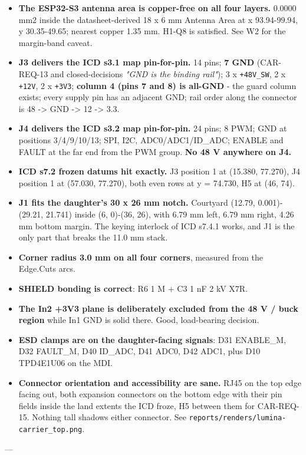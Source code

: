 \documentclass[11pt,a4paper]{article}
\begin{document}
\begin{itemize}
\item \textbf{The ESP32-S3 antenna area is copper-free on all four layers.} 0.0000 mm2 inside
the datasheet-derived 18 x 6 mm Antenna Area at x 93.94-99.94, y 30.35-49.65;
nearest copper 1.35 mm. H1-Q8 is satisfied. See W2 for the margin-band caveat.
\item \textbf{J3 delivers the ICD s3.1 map pin-for-pin.} 14 pins; \textbf{7 GND} (CAR-REQ-13 and
closed-decisions \emph{"GND is the binding rail"}); 3 x \texttt{+48V\_SW}, 2 x \texttt{+12V}, 2 x
\texttt{+3V3}; \textbf{column 4 (pins 7 and 8) is all-GND} - the guard column exists; every
supply pin has an adjacent GND; rail order along the connector is 48 -\textgreater{} GND -\textgreater{} 12
-\textgreater{} 3.3.
\item \textbf{J4 delivers the ICD s3.2 map pin-for-pin.} 24 pins; 8 PWM; GND at positions
3/4/9/10/13; SPI, I2C, ADC0/ADC1/ID\_ADC; ENABLE and FAULT at the far end from the
PWM group. \textbf{No 48 V anywhere on J4.}
\item \textbf{ICD s7.2 frozen datums hit exactly.} J3 position 1 at (15.380, 77.270), J4
position 1 at (57.030, 77.270), both even rows at y = 74.730, H5 at (46, 74).
\item \textbf{J1 fits the daughter's 30 x 26 mm notch.} Courtyard (12.79, 0.001)-(29.21,
21.741) inside (6, 0)-(36, 26), with 6.79 mm left, 6.79 mm right, 4.26 mm bottom
margin. The keying interlock of ICD s7.4.1 works, and J1 is the only part that
breaks the 11.0 mm stack.
\item \textbf{Corner radius 3.0 mm on all four corners}, measured from the Edge.Cuts arcs.
\item \textbf{SHIELD bonding is correct}: R6 1 M + C3 1 nF 2 kV X7R.
\item \textbf{The In2 +3V3 plane is deliberately excluded from the 48 V / buck region} while
In1 GND is solid there. Good, load-bearing decision.
\item \textbf{ESD clamps are on the daughter-facing signals}: D31 ENABLE\_M, D32 FAULT\_M, D40
ID\_ADC, D41 ADC0, D42 ADC1, plus D10 TPD4E1U06 on the MDI.
\item \textbf{Connector orientation and accessibility are sane.} RJ45 on the top edge facing
out, both expansion connectors on the bottom edge with their pin fields inside the
land extents the ICD froze, H5 between them for CAR-REQ-15. Nothing tall shadows
either connector. See \texttt{reports/renders/lumina-carrier\_top.png}.
\end{itemize}
---
\end{document}
